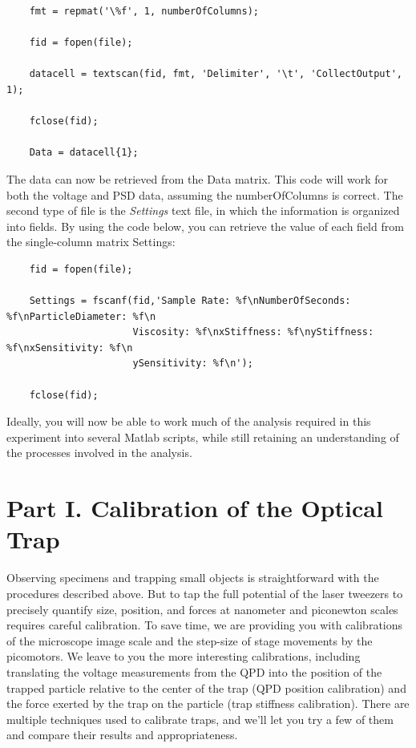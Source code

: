 \documentclass{../lab}
\begin{document}
\begin{verbatim}
    fmt = repmat('\%f', 1, numberOfColumns);

    fid = fopen(file);

    datacell = textscan(fid, fmt, 'Delimiter', '\t', 'CollectOutput', 1);

    fclose(fid);

    Data = datacell{1};
\end{verbatim}

The data can now be retrieved from the Data matrix. This code will work for both the voltage and PSD data, assuming the numberOfColumns is correct. The second type of file is the \emph{Settings} text file, in which the information is organized into fields. By using the code below, you can retrieve the value of each field from the single-column matrix Settings:

\begin{verbatim}
    fid = fopen(file);

    Settings = fscanf(fid,'Sample Rate: %f\nNumberOfSeconds: %f\nParticleDiameter: %f\n
                      Viscosity: %f\nxStiffness: %f\nyStiffness: %f\nxSensitivity: %f\n
                      ySensitivity: %f\n');
    
    fclose(fid);
\end{verbatim}

Ideally, you will now be able to work much of the analysis required in this experiment into several Matlab scripts, while still retaining an understanding of the processes involved in the analysis.



\section{Part I. Calibration of the Optical Trap}

Observing specimens and trapping small objects is straightforward with the procedures described above. But to tap the full potential of the laser tweezers to precisely quantify size, position, and forces at nanometer and piconewton scales requires careful calibration. To save time, we are providing you with calibrations of the microscope image scale and the step-size of stage movements by the picomotors. We leave to you the more interesting calibrations, including translating the voltage measurements from the QPD into the position of the trapped particle relative to the center of the trap (QPD position calibration) and the force exerted by the trap on the particle (trap stiffness calibration). There are multiple techniques used to calibrate traps, and we'll let you try a few of them and compare their results and appropriateness.
\end{document}
